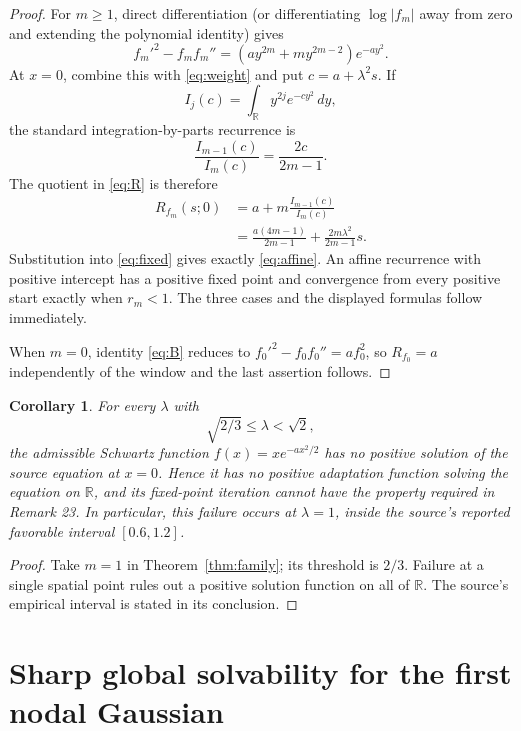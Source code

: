 \documentclass[11pt]{article}
\newtheorem{corollary}[theorem]{Corollary}
\theoremstyle{remark}
\newcommand{\R}{\mathbb R}
\begin{document}
\begin{proof}
For $m\geq1$, direct differentiation (or differentiating
$\log|f_m|$ away from zero and extending the polynomial identity) gives
\begin{equation}\label{eq:B}
 f_m'^2-f_mf_m''
 =\left(a y^{2m}+m y^{2m-2}\right)e^{-a y^2}.
\end{equation}
At $x=0$, combine this with \eqref{eq:weight} and put
$c=a+\lambda^2s$.  If
\[
 I_j(c)=\int_{\R}y^{2j}e^{-cy^2}\,dy,
\]
the standard integration-by-parts recurrence is
\[
 \frac{I_{m-1}(c)}{I_m(c)}=\frac{2c}{2m-1}.
\]
The quotient in \eqref{eq:R} is therefore
\begin{align*}
 R_{f_m}(s;0)
 &=a+m\frac{I_{m-1}(c)}{I_m(c)}\\
 &=\frac{a(4m-1)}{2m-1}
   +\frac{2m\lambda^2}{2m-1}s.
\end{align*}
Substitution into \eqref{eq:fixed} gives exactly \eqref{eq:affine}.  An affine
recurrence with positive intercept has a positive fixed point and convergence
from every positive start exactly when $r_m<1$.  The three cases and the
displayed formulas follow immediately.

When $m=0$, identity \eqref{eq:B} reduces to
$f_0'^2-f_0f_0''=a f_0^2$, so $R_{f_0}=a$ independently of the window and the
last assertion follows.
\end{proof}

\begin{corollary}\label{cor:counter}
For every $\lambda$ with
\[
 \sqrt{2/3}\leq\lambda<\sqrt2,
\]
the admissible Schwartz function $f(x)=x e^{-a x^2/2}$ has no positive
solution of the source equation at $x=0$.  Hence it has no positive adaptation
function solving the equation on $\R$, and its fixed-point iteration cannot
have the property required in Remark 23.  In particular, this failure occurs
at $\lambda=1$, inside the source's reported favorable interval $[0.6,1.2]$.
\end{corollary}

\begin{proof}
Take $m=1$ in Theorem~\ref{thm:family}; its threshold is $2/3$.  Failure at a
single spatial point rules out a positive solution function on all of $\R$.
The source's empirical interval is stated in its conclusion.
\end{proof}

\section{Sharp global solvability for the first nodal Gaussian}
\end{document}
